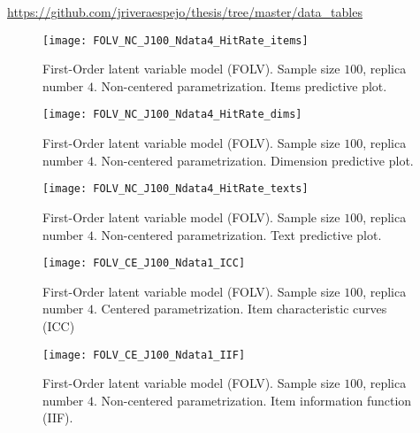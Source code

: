 \noindent \url{https://github.com/jriveraespejo/thesis/tree/master/data_tables} \\
%
\begin{figure}[H]
	\centering
	\texttt{[image: FOLV\_NC\_J100\_Ndata4\_HitRate\_items]}
	\caption[First-Order latent variable model (FOLV). Sample size $100$, replica number $4$. Non-centered parametrization. Items predictive plot.]%
	{First-Order latent variable model (FOLV). Sample size $100$, replica number $4$. Non-centered parametrization. Items predictive plot.}
	\label{fig:FOLV_NC_hitrate_items}
\end{figure}
%
\begin{figure}[H]
	\centering
	\texttt{[image: FOLV\_NC\_J100\_Ndata4\_HitRate\_dims]}
	\caption[First-Order latent variable model (FOLV). Sample size $100$, replica number $4$. Non-centered parametrization. Dimension predictive plot.]%
	{First-Order latent variable model (FOLV). Sample size $100$, replica number $4$. Non-centered parametrization. Dimension predictive plot.}
	\label{fig:FOLV_NC_hitrate_dim}
\end{figure}
%
\begin{figure}[H]
	\centering
	\texttt{[image: FOLV\_NC\_J100\_Ndata4\_HitRate\_texts]}
	\caption[First-Order latent variable model (FOLV). Sample size $100$, replica number $4$. Non-centered parametrization. Text predictive plot.]%
	{First-Order latent variable model (FOLV). Sample size $100$, replica number $4$. Non-centered parametrization. Text predictive plot.}
	\label{fig:FOLV_NC_hitrate_text}
\end{figure}
%
\begin{figure}[H]
	\centering
	\texttt{[image: FOLV\_CE\_J100\_Ndata1\_ICC]}
	\caption[First-Order latent variable model (FOLV). Sample size $100$, replica number $4$. Centered parametrization. Item characteristic curves (ICC).]%
	{First-Order latent variable model (FOLV). Sample size $100$, replica number $4$. Centered parametrization. Item characteristic curves (ICC)}
	\label{fig:FOLV_CE_ICC}
\end{figure}
%
\begin{figure}[H]
	\centering
	\texttt{[image: FOLV\_CE\_J100\_Ndata1\_IIF]}
	\caption[First-Order latent variable model (FOLV). Sample size $100$, replica number $4$. Non-centered parametrization. Item information function (IIF).]%
	{First-Order latent variable model (FOLV). Sample size $100$, replica number $4$. Non-centered parametrization. Item information function (IIF).}
	\label{fig:FOLV_CE_IIF}
\end{figure}